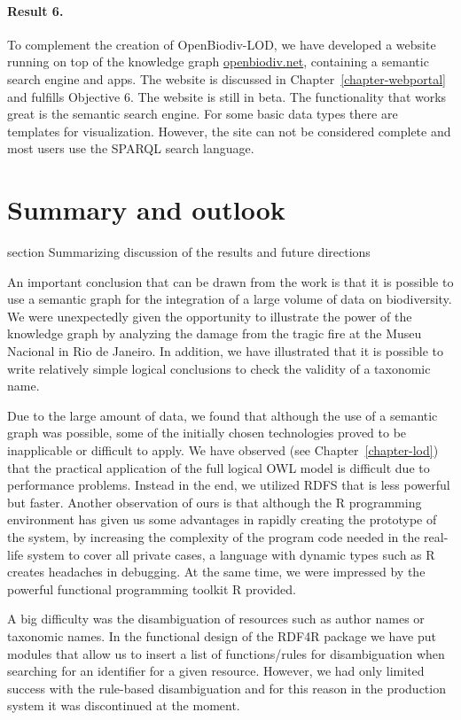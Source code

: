 \paragraph{Result 6.} To complement the creation of OpenBiodiv-LOD, we have developed a website running on top of the knowledge graph \href{http://openbiodiv.net}{openbiodiv.net}, containing a semantic search engine and apps. The website is discussed in Chapter~\ref{chapter-webportal} and fulfills Objective 6. The website is still in beta. The functionality that works great is the semantic search engine. For some basic data types there are templates for visualization. However, the site can not be considered complete and most users use the SPARQL search language.

\section * {Summary and outlook}
 {section} {Summarizing discussion of the results and future directions}

An important conclusion that can be drawn from the work is that it is possible to use a semantic graph for the integration of a large volume of data on biodiversity. We were unexpectedly given the opportunity to illustrate the power of the knowledge graph by analyzing the damage from the tragic fire at the Museu Nacional in Rio de Janeiro. In addition, we have illustrated that it is possible to write relatively simple logical conclusions to check the validity of a taxonomic name.

Due to the large amount of data, we found that although the use of a semantic graph was possible, some of the initially chosen technologies proved to be inapplicable or difficult to apply. We have observed (see Chapter~\ref {chapter-lod}) that the practical application of the full logical OWL model is difficult due to performance problems. Instead in the end, we utilized RDFS that is less powerful but faster. Another observation of ours is that although the R programming environment has given us some advantages in rapidly creating the prototype of the system, by increasing the complexity of the program code needed in the real-life system to cover all private cases, a language with dynamic types such as R creates headaches in debugging. At the same time, we were impressed by the powerful functional programming toolkit R provided.

A big difficulty was the disambiguation of resources such as author names or taxonomic names. In the functional design of the RDF4R package we have put modules that allow us to insert a list of functions/rules for disambiguation when searching for an identifier for a given resource. However, we had only limited success with the rule-based disambiguation and for this reason in the production system it was discontinued at the moment.

